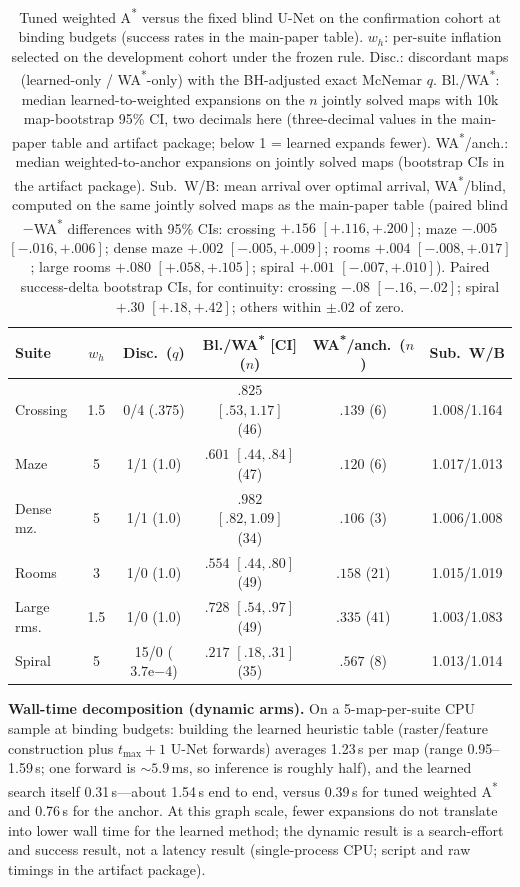 \documentclass[letterpaper]{article} %
\begin{document}
\begin{table}[t]
\centering
\small
\setlength{\tabcolsep}{1.3pt}
\begin{tabular}{@{}lccccc@{}}
\toprule
Suite & $w_h$ & Disc.\ ($q$) & Bl./WA\textsuperscript{*} [CI] ($n$) & WA\textsuperscript{*}/anch.\ ($n$) & Sub.\ W/B \\
\midrule
Crossing & 1.5 & 0/4 (.375) & $.825$ $[.53,1.17]$ (46) & $.139$ (6) & 1.008/1.164 \\
Maze & 5 & 1/1 (1.0) & $.601$ $[.44,.84]$ (47) & $.120$ (6) & 1.017/1.013 \\
Dense mz. & 5 & 1/1 (1.0) & $.982$ $[.82,1.09]$ (34) & $.106$ (3) & 1.006/1.008 \\
Rooms & 3 & 1/0 (1.0) & $.554$ $[.44,.80]$ (49) & $.158$ (21) & 1.015/1.019 \\
Large rms. & 1.5 & 1/0 (1.0) & $.728$ $[.54,.97]$ (49) & $.335$ (41) & 1.003/1.083 \\
Spiral & 5 & 15/0 ($3.7\mathrm{e}{-4}$) & $.217$ $[.18,.31]$ (35) & $.567$ (8) & 1.013/1.014 \\
\bottomrule
\end{tabular}
\caption{Tuned weighted A\textsuperscript{*} versus the fixed blind U-Net on the confirmation cohort at binding budgets (success rates in the main-paper table). $w_h$: per-suite inflation selected on the development cohort under the frozen rule. Disc.: discordant maps (learned-only / WA\textsuperscript{*}-only) with the BH-adjusted exact McNemar $q$. Bl./WA\textsuperscript{*}: median learned-to-weighted expansions on the $n$ jointly solved maps with 10k map-bootstrap 95\% CI, two decimals here (three-decimal values in the main-paper table and artifact package; below 1 = learned expands fewer). WA\textsuperscript{*}/anch.: median weighted-to-anchor expansions on jointly solved maps (bootstrap CIs in the artifact package). Sub.\ W/B: mean arrival over optimal arrival, WA\textsuperscript{*}/blind, computed on the same jointly solved maps as the main-paper table (paired blind$-$WA\textsuperscript{*} differences with 95\% CIs: crossing $+.156$ $[+.116,+.200]$; maze $-.005$ $[-.016,+.006]$; dense maze $+.002$ $[-.005,+.009]$; rooms $+.004$ $[-.008,+.017]$; large rooms $+.080$ $[+.058,+.105]$; spiral $+.001$ $[-.007,+.010]$). Paired success-delta bootstrap CIs, for continuity: crossing $-.08$ $[-.16,-.02]$; spiral $+.30$ $[+.18,+.42]$; others within $\pm.02$ of zero.}
\label{tab:wastar}
\end{table}

\textbf{Wall-time decomposition (dynamic arms).} On a 5-map-per-suite CPU sample at binding budgets: building the learned heuristic table (raster/feature construction plus $t_{\max}{+}1$ U-Net forwards) averages 1.23\,s per map (range 0.95--1.59\,s; one forward is ${\sim}5.9$\,ms, so inference is roughly half), and the learned search itself 0.31\,s---about 1.54\,s end to end, versus 0.39\,s for tuned weighted A\textsuperscript{*} and 0.76\,s for the anchor. At this graph scale, fewer expansions do not translate into lower wall time for the learned method; the dynamic result is a search-effort and success result, not a latency result (single-process CPU; script and raw timings in the artifact package).
\end{document}
